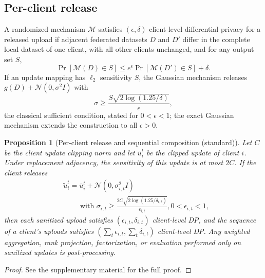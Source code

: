 \documentclass[a4paper,fleqn]{cas-dc}
\newtheorem{proposition}{Proposition}
\begin{document}
\subsection{Per-client release}
\par
A randomized mechanism $\mathcal{M}$ satisfies $(\epsilon,\delta)$ client-level differential privacy for a released upload if adjacent federated datasets $D$ and $D'$ differ in the complete local dataset of one client, with all other clients unchanged, and for any output set $S$,
\begin{equation}
\Pr[\mathcal{M}(D)\in S]\leq e^\epsilon \Pr[\mathcal{M}(D')\in S]+\delta .
\end{equation}
If an update mapping has $\ell_2$ sensitivity $S$, the Gaussian mechanism releases $g(D)+\mathcal{N}(0,\sigma^2I)$ with
\begin{equation}
\sigma \geq \frac{S\sqrt{2\log(1.25/\delta)}}{\epsilon},
\end{equation}
the classical sufficient condition, stated for $0<\epsilon<1$; the exact Gaussian mechanism extends the construction to all $\epsilon>0$.
\par
\begin{proposition}[Per-client release and sequential composition (standard)]
\label{thm:perround}
Let $C$ be the client update clipping norm and let $\bar u_i^t$ be the
clipped update of client $i$. Under replacement adjacency, the sensitivity
of this update is at most $2C$. If the client releases
\begin{equation}
\begin{aligned}
&\widetilde u_i^t = \bar u_i^t + \mathcal{N}(0,\sigma_{i,t}^2 I) \\
&\qquad\text{ with }
\sigma_{i,t} \geq \frac{2C\sqrt{2\log(1.25/\delta_{i,t})}}{\epsilon_{i,t}},
0<\epsilon_{i,t}<1,
\end{aligned}
\end{equation}
then each sanitized upload satisfies $(\epsilon_{i,t},\delta_{i,t})$
client-level DP, and the sequence of a client's uploads satisfies
$(\sum_t \epsilon_{i,t}, \sum_t \delta_{i,t})$ client-level DP. Any weighted
aggregation, rank projection, factorization, or evaluation performed only on
sanitized updates is post-processing.
\end{proposition}
\par
\begin{proof}
See the supplementary material for the full proof.
\end{proof}
\par
\end{document}
